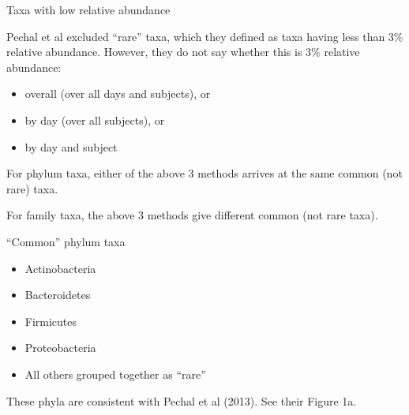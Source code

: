 \documentclass{beamer}
\begin{document}
\begin{frame}{Taxa with low relative abundance}

\noindent Pechal et al excluded ``rare'' taxa, which they defined as
taxa having less than 3\% relative abundance.  However, they do not
say whether this is 3\% relative abundance:
\begin{itemize}
\item overall (over all days and subjects), or
\item by day (over all subjects), or
\item by day and subject
\end{itemize}

\vspace{0.05in}

\noindent For phylum taxa, either of the above 3 methods arrives at the same common (not rare) taxa.

\vspace{0.05in}

\noindent For family taxa, the above 3 methods give different common (not rare taxa).

\end{frame}




\begin{frame}{``Common'' phylum taxa}

\begin{itemize}
\item Actinobacteria
\item Bacteroidetes
\item Firmicutes
\item Proteobacteria
\item All others grouped together as ``rare''
\end{itemize}

\vspace{0.05in}

\noindent These phyla are consistent with Pechal et al (2013).  See
their Figure 1a.

\end{frame}
\end{document}
